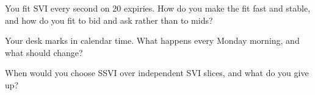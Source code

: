 \begin{interviewq}\label{iq:dv:parametrising-the-surface:4}
You fit SVI every second on 20 expiries. How do you make the fit fast and stable, and how do you fit to
bid and ask rather than to mids?
\end{interviewq}

\begin{interviewq}\label{iq:dv:parametrising-the-surface:5}
Your desk marks  in calendar time. What happens every Monday morning, and what should change?
\end{interviewq}

\begin{interviewq}\label{iq:dv:parametrising-the-surface:6}
When would you choose SSVI over independent SVI slices, and what do you give up?
\end{interviewq}
